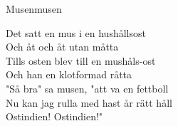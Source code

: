 \begin{song}{Musen}{musen}
\begin{vers}
Det satt en mus i en hushållsost\\
Och åt och åt utan måtta\\
Tills osten blev till en mushåls-ost\\
Och han en klotformad råtta\\
"Så bra" sa musen, "att va en fettboll\\
Nu kan jag rulla med hast år rätt håll\\
Ostindien! Ostindien!"\\
\end{vers}
\end{song}

